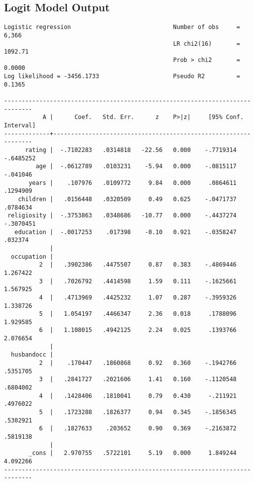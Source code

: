 \documentclass{article}
\begin{document}
\newpage
\hypertarget{logitoutput}{\subsection*{Logit Model Output}}
\begin{verbatim}
Logistic regression                             Number of obs     =      6,366
                                                LR chi2(16)       =    1092.71
                                                Prob > chi2       =     0.0000
Log likelihood = -3456.1733                     Pseudo R2         =     0.1365

------------------------------------------------------------------------------
           A |      Coef.   Std. Err.      z    P>|z|     [95% Conf. Interval]
-------------+----------------------------------------------------------------
      rating |  -.7102283   .0314818   -22.56   0.000    -.7719314   -.6485252
         age |  -.0612789   .0103231    -5.94   0.000    -.0815117    -.041046
       years |    .107976   .0109772     9.84   0.000     .0864611    .1294909
    children |   .0156448   .0320509     0.49   0.625    -.0471737    .0784634
 religiosity |  -.3753863   .0348686   -10.77   0.000    -.4437274   -.3070451
   education |  -.0017253    .017398    -0.10   0.921    -.0358247     .032374
             |
  occupation |
          2  |   .3902386   .4475507     0.87   0.383    -.4869446    1.267422
          3  |   .7026792   .4414598     1.59   0.111    -.1625661    1.567925
          4  |   .4713969   .4425232     1.07   0.287    -.3959326    1.338726
          5  |   1.054197   .4466347     2.36   0.018     .1788096    1.929585
          6  |   1.108015   .4942125     2.24   0.025     .1393766    2.076654
             |
  husbandocc |
          2  |    .170447   .1860868     0.92   0.360    -.1942766    .5351705
          3  |   .2841727   .2021606     1.41   0.160    -.1120548    .6804002
          4  |   .1428406   .1810041     0.79   0.430     -.211921    .4976022
          5  |   .1723288   .1826377     0.94   0.345    -.1856345    .5302921
          6  |   .1827633    .203652     0.90   0.369    -.2163872    .5819138
             |
       _cons |   2.970755   .5722101     5.19   0.000     1.849244    4.092266
------------------------------------------------------------------------------

\end{verbatim}
\end{document}
